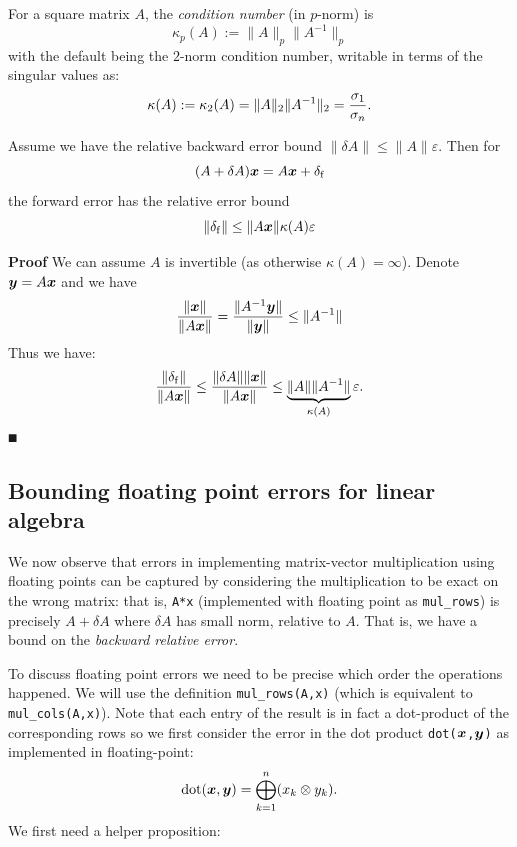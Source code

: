 \begin{definition} For a square matrix $A$, the \emph{condition number} (in $p$-norm) is
\[
\ensuremath{\kappa}_p(A) := \| A \|_p \| A^{-1} \|_p
\]
with the default being the $2$-norm condition number, writable in terms of the singular values as:
\[
\ensuremath{\kappa}(A) := \ensuremath{\kappa}_2(A) = \| A \|_2 \| A^{-1} \|_2 = {\ensuremath{\sigma}_1 \over \ensuremath{\sigma}_n}.
\]
\end{definition}

\begin{theorem} Assume we have the relative backward error bound $\|\ensuremath{\delta}A\| \ensuremath{\leq} \|A \| \ensuremath{\varepsilon}$. Then for 
\[
(A + \delta A) \bm{{\mbox{\boldmath$x$\unboldmath}}} = A \bm{{\mbox{\boldmath$x$\unboldmath}}} + \delta_{\rm f}
\]
the forward error has the relative error bound
\[
\|\delta_{\rm f}\|  \leq \| A \bm{{\mbox{\boldmath$x$\unboldmath}}} \| \kappa(A) \varepsilon
\]
\end{theorem}
\textbf{Proof} We can assume $A$ is invertible (as otherwise $\ensuremath{\kappa}(A) = \ensuremath{\infty}$). Denote $\bm{{\mbox{\boldmath$y$\unboldmath}}} = A \bm{{\mbox{\boldmath$x$\unboldmath}}}$ and we have
\[
{\|\bm{{\mbox{\boldmath$x$\unboldmath}}} \| \over \| A \bm{{\mbox{\boldmath$x$\unboldmath}}} \|} = {\|A^{-1} \bm{{\mbox{\boldmath$y$\unboldmath}}} \| \over \|\bm{{\mbox{\boldmath$y$\unboldmath}}} \|} \leq \| A^{-1}\|
\]
Thus we have:
\[
{\|\delta_{\rm f}\|  \over \| A \bm{{\mbox{\boldmath$x$\unboldmath}}} \|} \leq {\| \ensuremath{\delta}A \| \| \ensuremath{\bm{{\mbox{\boldmath$x$\unboldmath}}}} \| \over \| A \ensuremath{\bm{{\mbox{\boldmath$x$\unboldmath}}}} \| } \leq \underbrace{\|A \| \|A^{-1}\|}_{\kappa(A)} \varepsilon.
\]
\ensuremath{\QED}

\subsection{Bounding floating point errors for linear algebra}
We now observe that errors in implementing matrix-vector multiplication using floating points can be captured by considering the multiplication to be exact on the wrong matrix: that is, \texttt{A*x} (implemented with floating point as \texttt{mul\_rows}) is precisely $A + \ensuremath{\delta}A$ where $\ensuremath{\delta}A$ has small norm, relative to $A$. That is, we have a bound on the \emph{backward relative error}.

To discuss floating point errors we need to be precise which order the operations happened. We will use the definition \texttt{mul\_rows(A,x)} (which is equivalent to \texttt{mul\_cols(A,x)}).  Note that each entry of the result is in fact a dot-product of the corresponding rows so we first consider the error in the dot product  \texttt{dot(\ensuremath{\bm{\x}},\ensuremath{\bm{\y}})} as implemented in floating-point:
\[
{\rm dot}(\bm{{\mbox{\boldmath$x$\unboldmath}}},\bm{{\mbox{\boldmath$y$\unboldmath}}}) = \bigoplus_{k=1}^n (x_k \otimes y_k).
\]
We first need a helper proposition:

